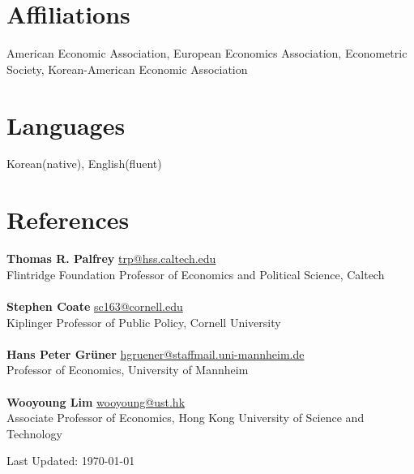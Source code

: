 \documentclass[margin, a4paper]{res}
\begin{document}
\begin{resume}
\section{Affiliations} American Economic Association, European Economics Association, Econometric Society, Korean-American Economic Association

\section{Languages} Korean(native), English(fluent)

\section{References} \textbf{Thomas R. Palfrey} \href{mailto:trp@hss.caltech.edu}{trp@hss.caltech.edu}\\
Flintridge Foundation Professor of Economics and Political Science, Caltech\\\\
\textbf{Stephen Coate} \href{mailto:sc163@cornell.edu}{sc163@cornell.edu}\\
Kiplinger Professor of Public Policy, Cornell University\\\\
\textbf{Hans Peter Gr\"{u}ner} \href{mailto:hgruener@staffmail.uni-mannheim.de}{hgruener@staffmail.uni-mannheim.de}\\
Professor of Economics, University of Mannheim\\\\
\textbf{Wooyoung Lim} \href{mailto:wooyoung@ust.hk}{wooyoung@ust.hk}\\
Associate Professor of Economics, Hong Kong University of Science and Technology
\begin{flushright}
Last Updated: \today
\end{flushright}
\end{resume} 
\end{document}
